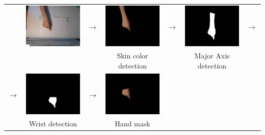 \begin{tabular}{ccccccc}
 & \includegraphics[width=4cm]{fig1/a.png} & $\rightarrow$ &
   \includegraphics[width=4cm]{fig1/b.png} & $\rightarrow$ &
   \includegraphics[width=4cm]{fig1/c.png} & $\rightarrow$ \\
& & & Skin color detection & & Major Axis detection \\
 $\rightarrow$ &
   \includegraphics[width=4cm]{fig1/d.png} & $\rightarrow$ &
   \includegraphics[width=4cm]{fig1/e.png} \\
	 & Wrist detection & & Hand mask
\end{tabular}
